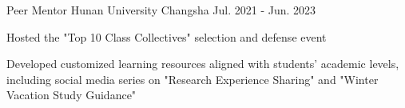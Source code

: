 \vspace{4.0mm}  
\cventry
{Peer Mentor} %
{Hunan University} %
{Changsha}
{Jul. 2021 - Jun. 2023}
{	
	\begin{cvitems} %
		\item{Hosted the "Top 10 Class Collectives" selection and defense event}
		\item{Developed customized learning resources aligned with students' academic levels, including social media series on "Research Experience Sharing" and "Winter Vacation Study Guidance"}
	\end{cvitems}
	\vspace{4mm}
} 